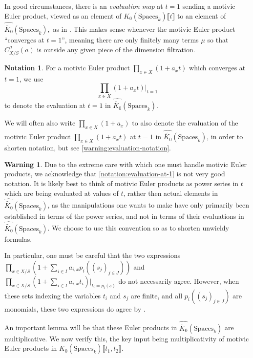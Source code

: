\documentclass[12 pt]{amsart}
\newcommand{\rboxed}[1]{#1}
\theoremstyle{plain}
\theoremstyle{definition}
\newtheorem{warn}[theorem]{Warning}
\newtheorem{notation}[theorem]{Notation}
\theoremstyle{remark}
\numberwithin{equation}{section}
\newcommand\grSpaces{K_0(\mathrm{Spaces}_k)} %
\newcommand\grcSpaces{\widehat{\widetilde{K_0}}(\mathrm{Spaces}_k)} %
\begin{document}
In good circumstances, there is an {\em evaluation map} at $t = 1$ sending a
motivic Euler product, viewed as an element of $\grSpaces \llbracket t
\rrbracket$ to an element of $\grcSpaces,$
as in \cite[Definition 6.4.1 and Notation
6.4.2]{biluH:motivic-euler-products-in-motivic-statistics}.
This makes sense whenever the
motivic Euler product ``converges at $t =1$'', meaning there are only finitely
many terms $\mu$ so that $C^\mu_{X/S}(a)$ is outside any given piece of the
dimension filtration.  

\begin{notation} \label{notation:evaluation-at-1} 
For a
	motivic Euler product 
	$\prod_{x \in X} \left( 1 + a_x t \right)$
	which converges at $t = 1$, we use
	$$\rboxed{\prod_{x \in X} \left( 1 + a_x t \right)|_{t = 1}}$$ to denote the
	evaluation at $t=1$ in $\grcSpaces$.  

	We will often also write
	$\rboxed{\prod_{x \in X} \left( 1 + a_{x} \right)}$ to also denote the
	evaluation of the motivic Euler product $\prod_{x \in X} \left( 1 +
	a_x t \right)$ at $t = 1$ in $\grcSpaces$,
	in order to shorten notation,
	but see
	\autoref{warning:evaluation-notation}.
\end{notation} 

\begin{warn}
	\label{warning:evaluation-notation} Due to the extreme care with which one must handle
	motivic Euler products, we acknowledge that
	\autoref{notation:evaluation-at-1} is not very good notation.  It is
	likely best to think of motivic Euler products as power series in $t$
	which are being evaluated at values of $t$, rather then actual elements
	in $\grcSpaces$, as the manipulations one wants to make have only
	primarily been established in terms of the power series, and not in
	terms of their evaluations in $\grcSpaces$.  We choose to use this
	convention so as to shorten unwieldy formulas.  

	In particular, one must be careful that the two expressions
	$\prod_{x \in X/S} \left(1 + \sum_{i \in I} a_{i,x} p_i( (s_j)_{j \in J} )\right)$
and 
$\prod_{x \in X/S} \left(1 + \sum_{i \in I} a_{i,x} t_i\right)|_{t_i =
p_i(\underline{s})}$
do not necessarily agree. However, when these sets indexing the variables $t_i$
and $s_j$ are finite, and all $p_i((s_j)_{j \in J})$ are monomials, these
two expressions do agree by \cite[Lemma
6.5.1]{biluH:motivic-euler-products-in-motivic-statistics}. 
\end{warn}

An important lemma will be that these Euler products in $\grcSpaces$ are
multiplicative. 
We now verify this, the key input being multiplicativity of motivic Euler
products in 
$\grSpaces \llbracket t_1,t_2 \rrbracket$.
\end{document}
